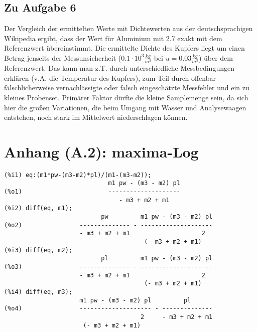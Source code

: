 \documentclass[12pt,a4paper,notitlepage]{article}
\begin{document}
\subsection{Zu Aufgabe 6}
Der Vergleich der ermittelten Werte mit Dichtewerten aus der deutschsprachigen Wikipedia ergibt, dass der Wert für Aluminium mit 2.7 exakt mit dem Referenzwert übereinstimmt. Die ermittelte Dichte des Kupfers liegt um einen Betrag jenseits der Messunsicherheit ($0.1\cdot 10^3\frac{kg}{m^3}$ bei $u=0.03\frac{kg}{m^3}$) über dem Referenzwert. Das kann man z.T. durch unterschiedliche Messbedingungen erklären (v.A. die Temperatur des Kupfers), zum Teil durch offenbar fälschlicherweise vernachlässigte oder falsch eingeschätzte Messfehler und ein zu kleines Probenset. Primärer Faktor dürfte die kleine Samplemenge sein, da sich hier die großen Variationen, die beim Umgang mit Wasser und Analysewaagen entstehen, noch stark im Mittelwert niederschlagen können.

\section*{Anhang (A.2): maxima-Log}
\begin{verbatim}
(%i1) eq:(m1*pw-(m3-m2)*pl)/(m1-(m3-m2));
                             m1 pw - (m3 - m2) pl
(%o1)                        --------------------
                                - m3 + m2 + m1
(%i2) diff(eq, m1);
                           pw         m1 pw - (m3 - m2) pl
(%o2)                -------------- - --------------------
                     - m3 + m2 + m1                    2
                                       (- m3 + m2 + m1)
(%i3) diff(eq, m2);
                           pl         m1 pw - (m3 - m2) pl
(%o3)                -------------- - --------------------
                     - m3 + m2 + m1                    2
                                       (- m3 + m2 + m1)
(%i4) diff(eq, m3);
                     m1 pw - (m3 - m2) pl         pl
(%o4)                -------------------- - --------------
                                      2     - m3 + m2 + m1
                      (- m3 + m2 + m1)
\end{verbatim}
\end{document}
